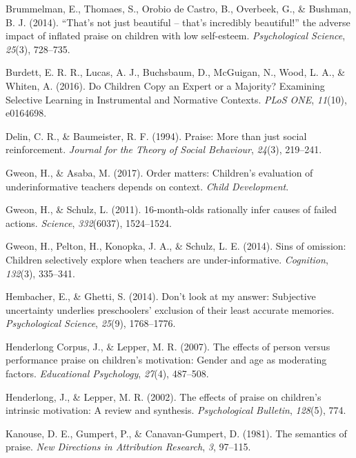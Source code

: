 \documentclass[10pt, letterpaper]{article}
\begin{document}
\hypertarget{ref-brummelman2014s}{}
Brummelman, E., Thomaes, S., Orobio de Castro, B., Overbeek, G., \&
Bushman, B. J. (2014). ``That's not just beautiful -- that's incredibly
beautiful!'' the adverse impact of inflated praise on children with low
self-esteem. \emph{Psychological Science}, \emph{25}(3), 728--735.

\hypertarget{ref-Burdett:2016es}{}
Burdett, E. R. R., Lucas, A. J., Buchsbaum, D., McGuigan, N., Wood, L.
A., \& Whiten, A. (2016). Do Children Copy an Expert or a Majority?
Examining Selective Learning in Instrumental and Normative Contexts.
\emph{PLoS ONE}, \emph{11}(10), e0164698.

\hypertarget{ref-delin1994praise}{}
Delin, C. R., \& Baumeister, R. F. (1994). Praise: More than just social
reinforcement. \emph{Journal for the Theory of Social Behaviour},
\emph{24}(3), 219--241.

\hypertarget{ref-gweon2017order}{}
Gweon, H., \& Asaba, M. (2017). Order matters: Children's evaluation of
underinformative teachers depends on context. \emph{Child Development}.

\hypertarget{ref-gweon201116}{}
Gweon, H., \& Schulz, L. (2011). 16-month-olds rationally infer causes
of failed actions. \emph{Science}, \emph{332}(6037), 1524--1524.

\hypertarget{ref-gweon2014sins}{}
Gweon, H., Pelton, H., Konopka, J. A., \& Schulz, L. E. (2014). Sins of
omission: Children selectively explore when teachers are
under-informative. \emph{Cognition}, \emph{132}(3), 335--341.

\hypertarget{ref-hembacher2014don}{}
Hembacher, E., \& Ghetti, S. (2014). Don't look at my answer: Subjective
uncertainty underlies preschoolers' exclusion of their least accurate
memories. \emph{Psychological Science}, \emph{25}(9), 1768--1776.

\hypertarget{ref-henderlong2007effects}{}
Henderlong Corpus, J., \& Lepper, M. R. (2007). The effects of person
versus performance praise on children's motivation: Gender and age as
moderating factors. \emph{Educational Psychology}, \emph{27}(4),
487--508.

\hypertarget{ref-henderlong2002effects}{}
Henderlong, J., \& Lepper, M. R. (2002). The effects of praise on
children's intrinsic motivation: A review and synthesis.
\emph{Psychological Bulletin}, \emph{128}(5), 774.

\hypertarget{ref-kanouse1981semantics}{}
Kanouse, D. E., Gumpert, P., \& Canavan-Gumpert, D. (1981). The
semantics of praise. \emph{New Directions in Attribution Research},
\emph{3}, 97--115.
\end{document}
